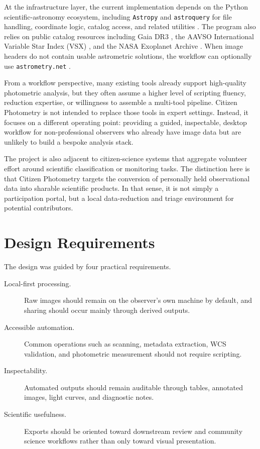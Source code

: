 \documentclass[modern]{aastex701}
\begin{document}
At the infrastructure layer, the current implementation depends on the Python scientific-astronomy ecosystem, including \texttt{Astropy} and \texttt{astroquery} for file handling, coordinate logic, catalog access, and related utilities \citep{astropy2013,astropy2018,ginsburg2019}. The program also relies on public catalog resources including Gaia DR3 \citep{gaia-dr3}, the AAVSO International Variable Star Index (VSX) \citep{vsx}, and the NASA Exoplanet Archive \citep{nasa-exoplanet-archive}. When image headers do not contain usable astrometric solutions, the workflow can optionally use \texttt{astrometry.net} \citep{astrometrynet}.

From a workflow perspective, many existing tools already support high-quality photometric analysis, but they often assume a higher level of scripting fluency, reduction expertise, or willingness to assemble a multi-tool pipeline. Citizen Photometry is not intended to replace those tools in expert settings. Instead, it focuses on a different operating point: providing a guided, inspectable, desktop workflow for non-professional observers who already have image data but are unlikely to build a bespoke analysis stack.

The project is also adjacent to citizen-science systems that aggregate volunteer effort around scientific classification or monitoring tasks. The distinction here is that Citizen Photometry targets the conversion of personally held observational data into sharable scientific products. In that sense, it is not simply a participation portal, but a local data-reduction and triage environment for potential contributors.

\section{Design Requirements}\label{sec:requirements}

The design was guided by four practical requirements.

\begin{description}
\item[Local-first processing.] Raw images should remain on the observer's own machine by default, and sharing should occur mainly through derived outputs.
\item[Accessible automation.] Common operations such as scanning, metadata extraction, WCS validation, and photometric measurement should not require scripting.
\item[Inspectability.] Automated outputs should remain auditable through tables, annotated images, light curves, and diagnostic notes.
\item[Scientific usefulness.] Exports should be oriented toward downstream review and community science workflows rather than only toward visual presentation.
\end{description}
\end{document}
